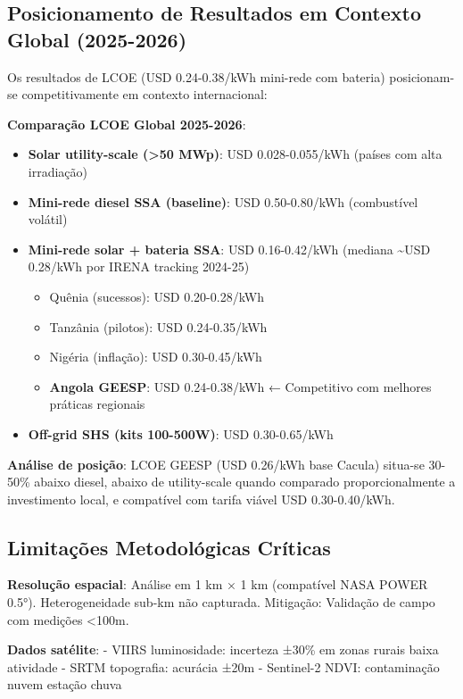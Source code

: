 \documentclass[12pt, a4paper]{article}
\begin{document}
\subsection{Posicionamento de Resultados em Contexto Global (2025-2026)}

Os resultados de LCOE (USD 0.24-0.38/kWh mini-rede com bateria) posicionam-se competitivamente em contexto internacional:

\textbf{Comparação LCOE Global 2025-2026}:

\begin{itemize}
  \item \textbf{Solar utility-scale (>50 MWp)}: USD 0.028-0.055/kWh (países com alta irradiação)
  \item \textbf{Mini-rede diesel SSA (baseline)}: USD 0.50-0.80/kWh (combustível volátil)
  \item \textbf{Mini-rede solar + bateria SSA}: USD 0.16-0.42/kWh (mediana \textasciitilde{}USD 0.28/kWh por IRENA tracking 2024-25)
  \begin{itemize}
    \item Quênia (sucessos): USD 0.20-0.28/kWh
    \item Tanzânia (pilotos): USD 0.24-0.35/kWh
    \item Nigéria (inflação): USD 0.30-0.45/kWh
    \item \textbf{Angola GEESP}: USD 0.24-0.38/kWh ← Competitivo com melhores práticas regionais
  \end{itemize}
  \item \textbf{Off-grid SHS (kits 100-500W)}: USD 0.30-0.65/kWh
\end{itemize}

\textbf{Análise de posição}: LCOE GEESP (USD 0.26/kWh base Cacula) situa-se 30-50\% abaixo diesel, abaixo de utility-scale quando comparado proporcionalmente a investimento local, e compatível com tarifa viável USD 0.30-0.40/kWh.

\subsection{Limitações Metodológicas Críticas}

\textbf{Resolução espacial}: Análise em 1 km × 1 km (compatível NASA POWER 0.5°). Heterogeneidade sub-km não capturada. Mitigação: Validação de campo com medições <100m.

\textbf{Dados satélite}: 
- VIIRS luminosidade: incerteza ±30\% em zonas rurais baixa atividade
- SRTM topografia: acurácia ±20m
- Sentinel-2 NDVI: contaminação nuvem estação chuva
\end{document}
